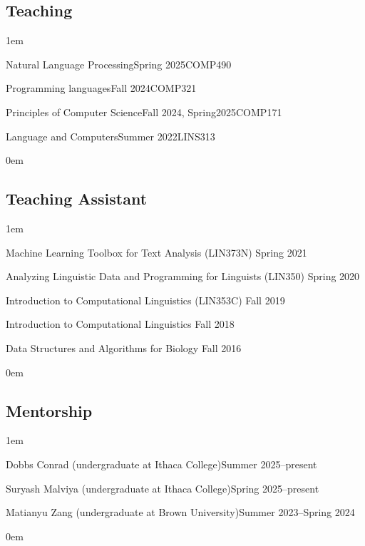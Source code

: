 \subsection{Teaching}
\leftskip1em\relax

  {Natural Language Processing}{Spring 2025}{COMP490}{}

  {Programming languages}{Fall 2024}{COMP321}{}
  
  {Principles of Computer Science}{Fall 2024, Spring2025}{COMP171}{}

  {Language and Computers}{Summer 2022}{LINS313}{}

\leftskip0em\relax
  
\subsection{Teaching Assistant}
\leftskip1em\relax
\vspace{0.6\baselineskip}

\textbullet\enspace Machine Learning Toolbox for Text Analysis ({\rmsc LIN373N}) \hfill Spring 2021

\textbullet\enspace Analyzing Linguistic Data and Programming for Linguists ({\rmsc LIN350}) \hfill Spring 2020

\textbullet\enspace Introduction to Computational Linguistics ({\rmsc LIN353C}) \hfill Fall 2019

\textbullet\enspace Introduction to Computational Linguistics \hfill Fall 2018

\textbullet\enspace Data Structures and Algorithms for Biology \hfill Fall 2016

\leftskip0em\relax

\subsection{Mentorship}
\leftskip1em\relax

  {\normalsize Dobbs Conrad (undergraduate at Ithaca College)}{\normalsize Summer 2025--present}{}{}

  {\normalsize Suryash Malviya (undergraduate at Ithaca College)}{\normalsize Spring 2025--present}{}{}
  
  {\normalsize Matianyu Zang (undergraduate at Brown University)}{\normalsize Summer 2023--Spring 2024}{}{}

\leftskip0em\relax
